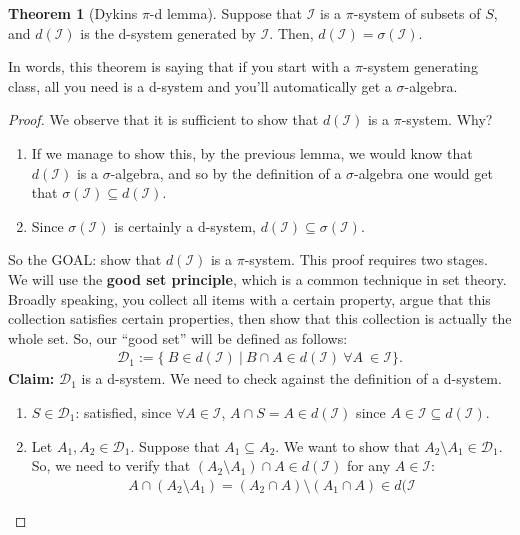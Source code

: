 \documentclass[11pt]{article}
\theoremstyle{definition}
\theoremstyle{theorem}
\newtheorem{thm}{Theorem}[section]
\newcommand{\pisys}[0]{\mathcal{I}}
\begin{document}
\begin{thm}[Dykins \( \pi \)-d lemma]
	Suppose that \( \pisys \) is a \( \pi \)-system of subsets of \( S \), and \( d( \pisys ) \) is the d-system generated by \( \pisys \). Then, \( d( \pisys ) = \sigma ( \pisys ) \).
\end{thm}
In words, this theorem is saying that if you start with a \( \pi \)-system generating class, all you need is a d-system and you'll automatically get a \( \sigma \)-algebra. 
\begin{proof}
	We observe that it is sufficient to show that \( d( \pisys ) \) is a \( \pi \)-system. Why?
	\begin{enumerate}[noitemsep]
		\item If we manage to show this, by the previous lemma, we would know that \( d ( \pisys ) \) is a \( \sigma \)-algebra, and so by the definition of a \( \sigma \)-algebra one would get that \( \sigma ( \pisys ) \subseteq d ( \pisys ) \).
		\item Since \( \sigma ( \pisys ) \) is certainly a d-system, \( d( \pisys ) \subseteq \sigma ( \pisys ) \).
	\end{enumerate}
	So the GOAL: show that \( d ( \pisys ) \) is a \( \pi \)-system. This proof requires two stages. We will use the \textbf{good set principle}, which is a common technique in set theory. Broadly speaking, you collect all items with a certain property, argue that this collection satisfies certain properties, then show that this collection is actually the whole set. So, our ``good set'' will be defined as follows: 
	\begin{align*}
		\mathcal{D}_1 := \{\ B \in d( \pisys )\ |\ B \cap A \in d (\pisys)\ \forall A\ \in \pisys \}.	
	\end{align*}
	\textbf{Claim:} \( \mathcal{D}_1 \) is a d-system. We need to check against the definition of a d-system. 
	\begin{enumerate}[noitemsep]
		\item \( S \in \mathcal{D}_1 \): satisfied, since \( \forall A \in \pisys \), \( A \cap S = A \in d (\pisys) \) since \( A \in \mathcal{I} \subseteq d ( \mathcal{I}) \). 
		\item Let \( A_1, A_2 \in \mathcal{D}_1 \). Suppose that \( A_1 \subseteq A_2 \). We want to show that \( A_2 \setminus A_1 \in \mathcal{D}_1 \). So, we need to verify that \( ( A_2 \setminus A_1) \cap A \in d ( \mathcal{I})  \) for any \( A \in \mathcal{I} \):
		\begin{align*}
			A \cap (A_2 \setminus A_1 ) = ( A_2 \cap A) \setminus (A_1 \cap A ) \in d(\mathcal{I} 

\end{align*}
\end{enumerate}
\end{proof}
\end{document}
